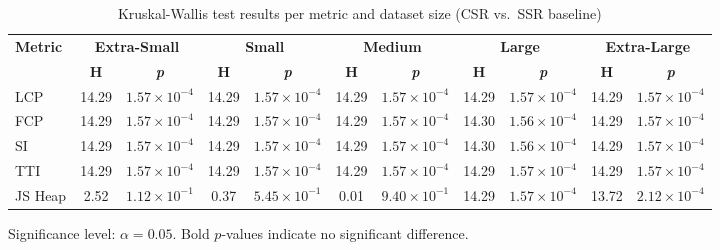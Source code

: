 \begin{table}[!t]
\centering
\footnotesize
\caption{Kruskal-Wallis test results per metric and dataset size (CSR vs.\ SSR baseline)}
\label{tabela:estatistica}
\begin{tabular}{|l|c|c|c|c|c|c|c|c|c|c|}
\hline
\multirow{2}{*}{\textbf{Metric}} &
\multicolumn{2}{c|}{\textbf{Extra-Small}} &
\multicolumn{2}{c|}{\textbf{Small}} &
\multicolumn{2}{c|}{\textbf{Medium}} &
\multicolumn{2}{c|}{\textbf{Large}} &
\multicolumn{2}{c|}{\textbf{Extra-Large}} \\
\cline{2-11}
& \textbf{H} & \textbf{\textit{p}} & \textbf{H} & \textbf{\textit{p}} & \textbf{H} & \textbf{\textit{p}} & \textbf{H} & \textbf{\textit{p}} & \textbf{H} & \textbf{\textit{p}} \\
\hline
LCP      & 14.29 & $1.57{\times}10^{-4}$ & 14.29 & $1.57{\times}10^{-4}$ & 14.29 & $1.57{\times}10^{-4}$ & 14.29 & $1.57{\times}10^{-4}$ & 14.29 & $1.57{\times}10^{-4}$ \\
FCP      & 14.29 & $1.57{\times}10^{-4}$ & 14.29 & $1.57{\times}10^{-4}$ & 14.29 & $1.57{\times}10^{-4}$ & 14.30 & $1.56{\times}10^{-4}$ & 14.29 & $1.57{\times}10^{-4}$ \\
SI       & 14.29 & $1.57{\times}10^{-4}$ & 14.29 & $1.57{\times}10^{-4}$ & 14.29 & $1.57{\times}10^{-4}$ & 14.30 & $1.56{\times}10^{-4}$ & 14.29 & $1.57{\times}10^{-4}$ \\
TTI      & 14.29 & $1.57{\times}10^{-4}$ & 14.29 & $1.57{\times}10^{-4}$ & 14.29 & $1.57{\times}10^{-4}$ & 14.29 & $1.57{\times}10^{-4}$ & 14.29 & $1.57{\times}10^{-4}$ \\
JS Heap  &  2.52 & $1.12{\times}10^{-1}$ &  0.37 & $5.45{\times}10^{-1}$ &  0.01 & $9.40{\times}10^{-1}$ & 14.29 & $1.57{\times}10^{-4}$ & 13.72 & $2.12{\times}10^{-4}$ \\
\hline
\end{tabular}
\vspace{2pt}
\begin{flushleft}
\footnotesize
Significance level: $\alpha = 0.05$. Bold $p$-values indicate no significant difference.
\end{flushleft}
\end{table}
